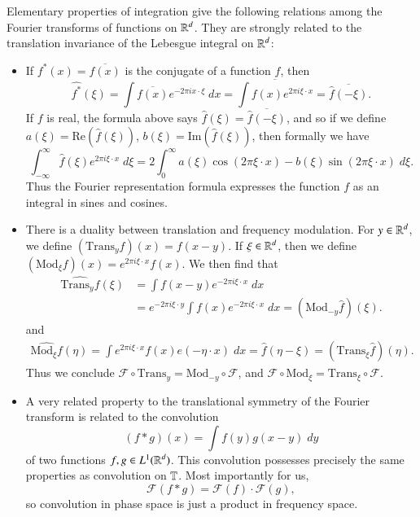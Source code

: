 Elementary properties of integration give the following relations among the Fourier transforms of functions on $\operatorname{\mathbb{R}}^d$. They are strongly related to the translation invariance of the Lebesgue integral on $\operatorname{\mathbb{R}}^d$:
%
\begin{itemize}
    \item If $f^*(x) = \overline{f(x)}$ is the conjugate of a function $f$, then
    \[ \widehat{f^*}(\xi) = \int \overline{f(x)} e^{-2 \pi i x \cdot \xi}\; dx = \overline{\int f(x) e^{2 \pi i \xi \cdot x}} = \overline{\widehat{f}(-\xi)}. \]
    If $f$ is real, the formula above says $\widehat{f}(\xi) = \overline{\widehat{f}(-\xi)}$, and so if we define $a(\xi) = \text{Re}(\widehat{f}(\xi))$, $b(\xi) = \text{Im}(\widehat{f}(\xi))$, then formally we have
    \[ \int_{-\infty}^\infty \widehat{f}(\xi) e^{2 \pi i \xi \cdot x}\; d\xi = 2 \int_0^\infty a(\xi) \cos(2 \pi \xi \cdot x) - b(\xi) \sin(2 \pi \xi \cdot x)\; d\xi. \]
    Thus the Fourier representation formula expresses the function $f$ as an integral in sines and cosines.
    
    \item There is a duality between translation and frequency modulation. For $y \in \operatorname{\mathbb{R}}^d$, we define $(\text{Trans}_y f)(x) = f(x - y)$. If $\xi \in \operatorname{\mathbb{R}}^d$, then we define $(\text{Mod}_\xi f)(x) = e^{2 \pi i \xi \cdot x} f(x)$. We then find that
    \begin{align*}
        \widehat{\text{Trans}_y f}(\xi) &= \int f(x - y) e^{-2\pi i \xi \cdot x}\; dx\\
        &= e^{- 2 \pi i \xi \cdot y} \int f(x) e^{- 2 \pi i \xi \cdot x}\; dx = (\text{Mod}_{-y} \widehat{f})(\xi).
    \end{align*}
    and
    \begin{align*}
        \widehat{\text{Mod}_\xi f}(\eta) = \int e^{2 \pi i \xi \cdot x} f(x) e(- \eta \cdot x)\; dx = \widehat{f}(\eta - \xi) = (\text{Trans}_\xi \widehat{f})(\eta).
    \end{align*}
    Thus we conclude $\mathcal{F} \circ \text{Trans}_y = \text{Mod}_{-y} \circ \mathcal{F}$, and $\mathcal{F} \circ \text{Mod}_\xi = \text{Trans}_\xi \circ \mathcal{F}$.

    \item A very related property to the translational symmetry of the Fourier transform is related to the convolution
    \[ (f * g)(x) = \int f(y) g(x-y)\; dy \]
    of two functions $f,g \in L^1(\operatorname{\mathbb{R}}^d)$. This convolution possesses precisely the same properties as convolution on $\operatorname{\mathbb{T}}$. Most importantly for us,
    \[ \mathcal{F}(f * g) = \mathcal{F}(f) \cdot \mathcal{F}(g), \]
    so convolution in phase space is just a product in frequency space.


\end{itemize}
